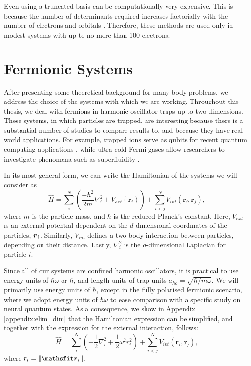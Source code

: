 Even using a truncated basis can be computationally very expensive. This is because the number of determinants required increases factorially with the number of electrons and orbitals \cite{jensen2017introduction}. Therefore, these methods are used only in modest systems with up to no more than 100 electrons.

\section{Fermionic Systems}\label{sec:choice_of_systems}

After presenting some theoretical background for many-body problems, we address the choice of the systems with which we are working. Throughout this thesis, we deal with fermions in harmonic oscillator traps up to two dimensions. These systems, in which particles are trapped, are interesting because there is a substantial number of studies to compare results to, and because they have real-world applications. For example, trapped ions serve as qubits for recent quantum computing applications \cite{wittemer2020trapped}, while ultra-cold Fermi gases allow researchers to investigate phenomena such as superfluidity \cite{Sobirey_2021}.

In its most general form, we can write the Hamiltonian of the systems we will consider as
\begin{equation}
     \hat{H} = \sum_i^N \left(\frac{-\hbar^2}{2m}{\nabla }_{i}^2 +V_{ext}(\mathbf{r}_i)\right)  +
	 \sum_{i<j}^{N} V_{int}({\mathbf{r}}_i,{\mathbf{r}}_j),
\label{eq:2body_hamiltonian}
\end{equation}
where $m$ is the particle mass, and $\hbar$ is the reduced Planck's constant. Here, $V_{ext}$ is an external potential dependent on the $d$-dimensional coordinates of the particles, $\boldsymbol{r}_i$. Similarly, $V_{int}$ defines a two-body interaction between particles, depending on their distance. Lastly, ${\nabla }_{i}^2$ is the $d$-dimensional Laplacian for particle $i$. 

Since all of our systems are confined harmonic oscillators, it is practical to use energy units of $\hbar \omega$ or $\hbar$, and length units of trap units $a_{ho} = \sqrt{\hbar/m\omega}$. We will primarily use energy units of $\hbar$, except in the fully polarised fermionic scenario, where we adopt energy units of $\hbar\omega$ to ease comparison with a specific study on neural quantum states. As a consequence, we show in Appendix \ref{appendix:elim_dim} that the Hamiltonian expression can be simplified, and together with the expression for the external interaction, follows:
\begin{equation}
     \hat{H} = \sum_i^N \left(-\frac{1}{2}{\nabla }_{i}^2 + \frac{1}{2}\omega^2 r_i^2\right)  +
	 \sum_{i<j}^{N} V_{int}({\mathbf{r}}_i,{\mathbf{r}}_j),
\label{eq:2body_hamiltonian2}
\end{equation}
where $r_i = \norm{\mvec{r}_i}$.


